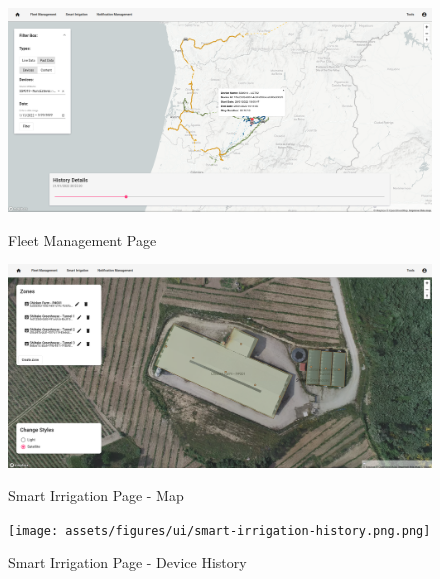 \begin{figure}[H]
   \centering
   \resizebox{\columnwidth}{!}
   {
      \includegraphics{assets/figures/ui/fleet.png}
   }
   \caption[Fleet Management Page]{Fleet Management Page}
   \label{fig:AppendixD:fleet}
\end{figure}

\begin{figure}[H]
   \centering
   \resizebox{\columnwidth}{!}
   {
      \includegraphics{assets/figures/ui/smart-irrigation-map.png}
   }
   \caption[Smart Irrigation Page - Map]{Smart Irrigation Page - Map}
   \label{fig:AppendixD:irrigmap}
\end{figure}

\begin{figure}[H]
   \centering
   \resizebox{\columnwidth}{!}
   {
      \texttt{[image: assets/figures/ui/smart-irrigation-history.png.png]}
   }
   \caption[Smart Irrigation Page - Device History]{Smart Irrigation Page - Device History}
   \label{fig:AppendixD:irrighistory}
\end{figure}
